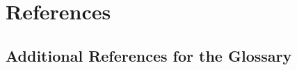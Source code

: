 \chapter{References}
\label{app:references}

\renewcommand{\bibname}{}
\nocite{*}

\makeatletter
\renewcommand{\url}[1]{\ltx@url{#1}}

\let\bib@chapter\chapter
\def\chapter{\@ifstar{\@gobble}{\bib@chapter}}
\let\@mkboth\@gobbletwo
\makeatother

\raggedright
\printbibliography[notcategory=glossrefs,heading=none]

\section{Additional References for the Glossary}
\printbibliography[category=glossrefs,heading=none]
